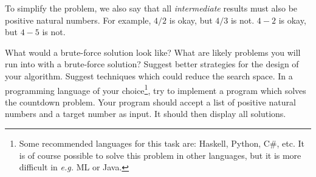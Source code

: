 \documentclass[10pt,a4paper,fleqn]{exam}
\begin{document}
\begin{questions}
To simplify the problem, we also say that all \emph{intermediate} results must also be positive natural numbers. For example, $4 / 2$ is okay, but $4 / 3$ is not. $4 - 2$ is okay, but $4 - 5$ is not.
\begin{parts}
\subpart What would a brute-force solution look like?
\subpart What are likely problems you will run into with a brute-force solution?
\subpart Suggest better strategies for the design of your algorithm.
\subpart Suggest techniques which could reduce the search space.
\subpart In a programming language of your choice\footnote{Some recommended languages for this task are: Haskell, Python, C\#, etc. It is of course possible to solve this problem in other languages, but it is more difficult in \emph{e.g.} ML or Java.}, try to implement a program which solves the countdown problem. Your program should accept a list of positive natural numbers and a target number as input. It should then display all solutions.
\end{parts}




\end{questions}
\end{document}
